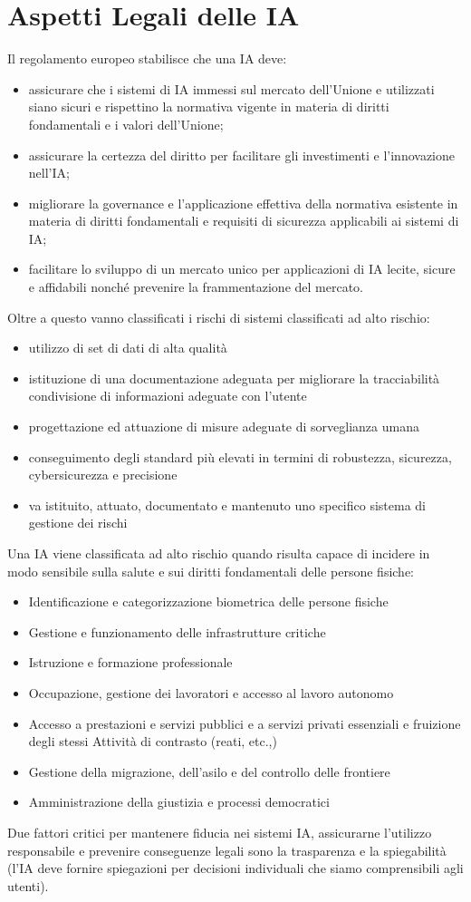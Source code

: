 \documentclass[12pt, a4paper]{article}
\begin{document}
\section{Aspetti Legali delle IA}
Il regolamento europeo stabilisce che una IA deve:
\begin{itemize}
    \item assicurare che i sistemi di IA immessi sul mercato dell’Unione e utilizzati siano sicuri e rispettino la normativa vigente in materia di diritti fondamentali e i valori dell’Unione; 
    \item assicurare la certezza del diritto per facilitare gli investimenti e l’innovazione nell’IA; 
    \item migliorare la governance e l’applicazione effettiva della normativa esistente in materia di diritti fondamentali e requisiti di sicurezza applicabili ai sistemi di IA; 
    \item facilitare lo sviluppo di un mercato unico per applicazioni di IA lecite, sicure e affidabili nonché prevenire la frammentazione del mercato.
\end{itemize}

Oltre a questo vanno classificati i rischi di sistemi classificati ad alto rischio:
\begin{itemize}
    \item utilizzo di set di dati di alta qualità 
    \item istituzione di una documentazione adeguata per migliorare la tracciabilità condivisione di informazioni adeguate con l’utente 
    \item progettazione ed attuazione di misure adeguate di sorveglianza umana 
    \item conseguimento degli standard più elevati in termini di robustezza, sicurezza, cybersicurezza e precisione 
    \item va istituito, attuato, documentato e mantenuto uno specifico sistema di gestione dei rischi
\end{itemize}

Una IA viene classificata ad alto rischio quando risulta capace di incidere in modo sensibile sulla salute e sui diritti fondamentali delle persone fisiche:
\begin{itemize}
    \item Identificazione e categorizzazione biometrica delle persone fisiche
    \item Gestione e funzionamento delle infrastrutture critiche 
    \item Istruzione e formazione professionale 
    \item Occupazione, gestione dei lavoratori e accesso al lavoro autonomo
    \item Accesso a prestazioni e servizi pubblici e a servizi privati essenziali e fruizione degli stessi Attività di contrasto (reati, etc.,)
    \item Gestione della migrazione, dell'asilo e del controllo delle frontiere
    \item Amministrazione della giustizia e processi democratici
\end{itemize}

Due fattori critici per mantenere fiducia nei sistemi IA, assicurarne l'utilizzo responsabile e prevenire conseguenze legali sono la trasparenza e la spiegabilità (l'IA deve fornire spiegazioni per decisioni individuali che siamo comprensibili agli utenti).
\end{document}
